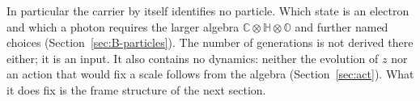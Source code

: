 In particular the carrier by itself identifies no particle. Which state is an electron and which a
photon requires the larger algebra
$\mathbb C\otimes\mathbb H\otimes\mathbb O$ and further named choices (Section~\ref{sec:B-particles}). The number of generations
is not derived there either; it is an input. It also contains
no dynamics: neither the evolution of $z$ nor an action that would fix a scale follows from the
algebra (Section~\ref{sec:act}). What it does fix is the frame structure of the next section.
